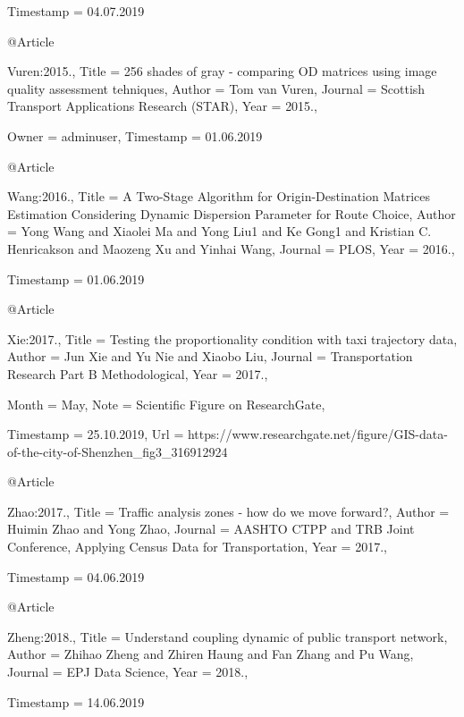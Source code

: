 {{{{  Timestamp                = {04.07.2019}
}

@Article{Vuren:2015.,
  Title                    = {256 shades of gray - comparing {OD} matrices using image quality assessment tehniques},
  Author                   = {Tom van Vuren},
  Journal                  = {Scottish Transport Applications Research (STAR)},
  Year                     = {2015.},

  Owner                    = {adminuser},
  Timestamp                = {01.06.2019}
}

@Article{Wang:2016.,
  Title                    = {{A Two-Stage Algorithm for Origin-Destination Matrices Estimation Considering Dynamic Dispersion Parameter for Route Choice}},
  Author                   = {Yong Wang and Xiaolei Ma and Yong Liu1 and Ke Gong1 and Kristian C. Henricakson and
Maozeng Xu and Yinhai Wang},
  Journal                  = {PLOS},
  Year                     = {2016.},

  Timestamp                = {01.06.2019}
}

@Article{Xie:2017.,
  Title                    = {Testing the proportionality condition with taxi trajectory data},
  Author                   = {Jun Xie and Yu Nie and Xiaobo Liu},
  Journal                  = {Transportation Research Part B Methodological},
  Year                     = {2017.},

  Month                    = {May},
  Note                     = {Scientific Figure on ResearchGate},

  Timestamp                = {25.10.2019},
  Url                      = {https://www.researchgate.net/figure/GIS-data-of-the-city-of-Shenzhen_fig3_316912924}
}

@Article{Zhao:2017.,
  Title                    = {Traffic analysis zones - how do we move forward?},
  Author                   = {Huimin Zhao and Yong Zhao},
  Journal                  = {AASHTO CTPP and TRB Joint Conference, Applying Census Data for Transportation},
  Year                     = {2017.},

  Timestamp                = {04.06.2019}
}

@Article{Zheng:2018.,
  Title                    = {Understand coupling dynamic of public transport network},
  Author                   = {Zhihao Zheng and Zhiren Haung and Fan Zhang and Pu Wang},
  Journal                  = {EPJ Data Science},
  Year                     = {2018.},

  Timestamp                = {14.06.2019}
}

}}}

